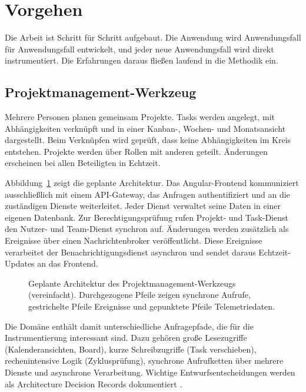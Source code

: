 \documentclass[11pt, a4paper]{article}
\begin{document}
\section{Vorgehen}\label{sec:vorgehen}

Die Arbeit ist Schritt für Schritt aufgebaut. Die Anwendung wird Anwendungsfall für Anwendungsfall entwickelt, und jeder neue Anwendungsfall wird direkt instrumentiert. Die Erfahrungen daraus fließen laufend in die Methodik ein.

\subsection{Projektmanagement-Werkzeug}

Mehrere Personen planen gemeinsam Projekte. Tasks werden angelegt, mit Abhängigkeiten verknüpft und in einer Kanban-, Wochen- und Monatsansicht dargestellt. Beim Verknüpfen wird geprüft, dass keine Abhängigkeiten im Kreis entstehen. Projekte werden über Rollen mit anderen geteilt. Änderungen erscheinen bei allen Beteiligten in Echtzeit.

Abbildung~\ref{fig:architektur} zeigt die geplante Architektur. Das Angular-Frontend kommuniziert ausschließlich mit einem API-Gateway, das Anfragen authentifiziert und an die zuständigen Dienste weiterleitet. Jeder Dienst verwaltet seine Daten in einer eigenen Datenbank. Zur Berechtigungsprüfung rufen Projekt- und Task-Dienst den Nutzer- und Team-Dienst synchron auf. Änderungen werden zusätzlich als Ereignisse über einen Nachrichtenbroker veröffentlicht. Diese Ereignisse verarbeitet der Benachrichtigungsdienst asynchron und sendet daraus Echtzeit-Updates an das Frontend.

\begin{figure}[htbp]
\centering
\resizebox{\textwidth}{!}{}
\caption{Geplante Architektur des Projektmanagement-Werkzeugs (vereinfacht). Durchgezogene Pfeile zeigen synchrone Aufrufe, gestrichelte Pfeile Ereignisse und gepunktete Pfeile Telemetriedaten.}
\label{fig:architektur}
\end{figure}

Die Domäne enthält damit unterschiedliche Anfragepfade, die für die Instrumentierung interessant sind. Dazu gehören große Lesezugriffe (Kalenderansichten, Board), kurze Schreibzugriffe (Task verschieben), rechenintensive Logik (Zyklusprüfung), synchrone Aufrufketten über mehrere Dienste und asynchrone Verarbeitung. Wichtige Entwurfsentscheidungen werden als Architecture Decision Records dokumentiert \cite{nygard2011adr}.
\end{document}
